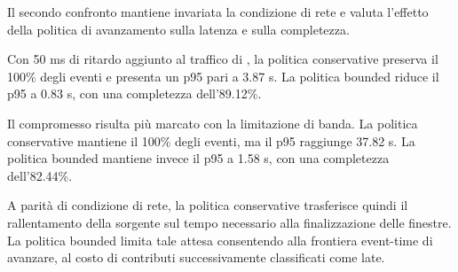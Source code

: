 Il secondo confronto mantiene invariata la condizione di rete e valuta
l'effetto della politica di avanzamento sulla latenza e sulla completezza.

\begin{table}[H]
    \caption{Confronto tra politiche conservative e bounded a parità di
    condizione di rete. Latenze e durata sono espresse in secondi.}
    \label{tab:network-policies}
    \centering
\end{table}



Con 50 ms di ritardo aggiunto al traffico di , la politica
conservative preserva il 100\% degli eventi e presenta un p95 pari a
3.87 s. La politica bounded riduce il p95 a 0.83 s, con una completezza
dell'89.12\%.

Il compromesso risulta più marcato con la limitazione di banda. La politica
conservative mantiene il 100\% degli eventi, ma il p95 raggiunge 37.82 s.
La politica bounded mantiene invece il p95 a 1.58 s, con una completezza
dell'82.44\%.

A parità di condizione di rete, la politica conservative trasferisce quindi
il rallentamento della sorgente sul tempo necessario alla finalizzazione
delle finestre. La politica bounded limita tale attesa consentendo alla
frontiera event-time di avanzare, al costo di contributi successivamente
classificati come late.



